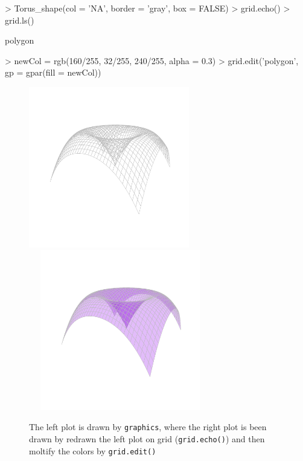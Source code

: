 \documentclass[paper=a4, fontsize=11pt]{report}
\begin{document}
\begin{Schunk}
\begin{Sinput}
> Torus_shape(col = 'NA', border = 'gray', box = FALSE)
> grid.echo()
> grid.ls()
\end{Sinput}
\begin{Soutput}
polygon
\end{Soutput}
\begin{Sinput}
> newCol = rgb(160/255, 32/255, 240/255, alpha = 0.3)
> grid.edit('polygon', gp = gpar(fill = newCol))
\end{Sinput}
\end{Schunk}

\begin{figure}[h]
\begin{center}
  \includegraphics[height = 7cm, width = 7cm]{figure/Chapter6_example_1_2.pdf}
  \includegraphics[height = 7cm, width = 8cm]{figure/Chapter6_example_1_3.pdf}
  \caption{The left plot is drawn by \texttt{graphics}, where the right plot is been drawn by redrawn the left plot on grid (\texttt{grid.echo()}) and then moltify the colors by \texttt{grid.edit()}}
  	\label{Example_6.1}
\end{center}
\end{figure}
\end{document}
